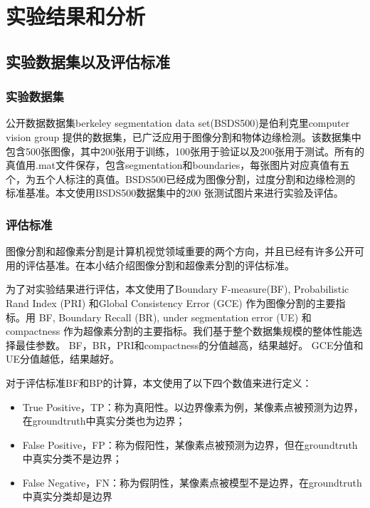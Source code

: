 
\chapter{实验结果和分析}

\section{实验数据集以及评估标准}

\subsection{实验数据集}

公开数据数据集berkeley segmentation data set(BSDS500)是伯利克里computer vision group 提供的数据集，已广泛应用于图像分割和物体边缘检测。该数据集中包含500张图像，其中200张用于训练，100张用于验证以及200张用于测试。所有的真值用.mat文件保存，包含segmentation和boundaries，每张图片对应真值有五个，为五个人标注的真值。BSDS500已经成为图像分割，过度分割和边缘检测的标准基准。本文使用BSDS500数据集中的200 张测试图片来进行实验及评估。

\subsection{评估标准}

图像分割和超像素分割是计算机视觉领域重要的两个方向，并且已经有许多公开可用的评估基准。在本小结介绍图像分割和超像素分割的评估标准。

为了对实验结果进行评估，本文使用了Boundary F-measure(BF), Probabilistic Rand Index (PRI) 和Global Consistency Error (GCE) 作为图像分割的主要指标。用 BF, Boundary Recall (BR), under segmentation error (UE) 和compactness 作为超像素分割的主要指标。我们基于整个数据集规模的整体性能选择最佳参数。 BF，BR，PRI和compactness的分值越高，结果越好。 GCE分值和UE分值越低，结果越好。

对于评估标准BF和BP的计算，本文使用了以下四个数值来进行定义：

\begin{itemize}
\item True Positive，TP：称为真阳性。以边界像素为例，某像素点被预测为边界，在groundtruth中真实分类也为边界；
\item False Positive，FP：称为假阳性，某像素点被预测为边界，但在groundtruth中真实分类不是边界；
\item False Negative，FN：称为假阴性，某像素点被模型不是边界，在groundtruth中真实分类却是边界
\end{itemize}

